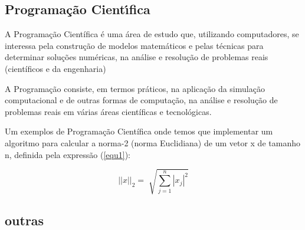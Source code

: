 \subsection{ Programa\c{c}\~{a}o Cient\'{\i}fica}
A Programação Científica é uma área de estudo que,
utilizando computadores, se interessa pela
construção de modelos matemáticos e pelas técnicas 
para determinar soluções numéricas, na
análise e resolução de problemas reais
(científicos e da engenharia)

A Programação consiste, em termos práticos, na aplicação da 
simulação computacional e de outras formas de
computação, na análise e resolução de problemas 
reais em várias áreas científicas e tecnológicas.

Um exemplos de Programação Científica onde temos que implementar um 
algoritmo para calcular a norma-2 (norma Euclidiana) de um vetor x
de tamanho n, definida pela expressão (\ref*{equ1}):

\begin{center}
   \begin{equation}
      ||x||_{2} = \sqrt[]{\sum^{n}_{j=1} |x_{j}|^{2}}
      \label{equ1}
   \end{equation}
\end{center}


\subsection{ outras}